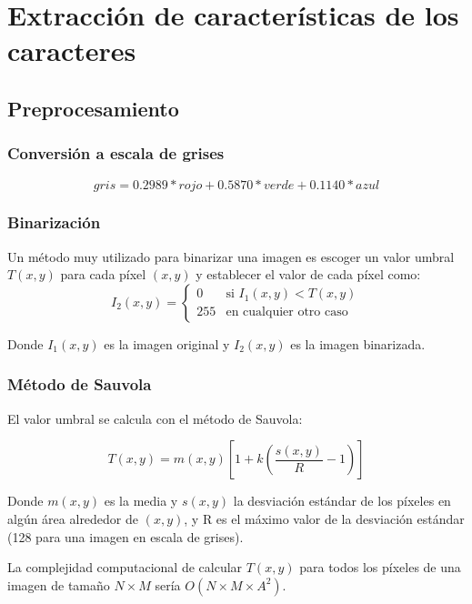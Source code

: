 \documentclass{beamer}
\begin{document}
	
	\section{Extracción de características de los caracteres}
	
	\subsection{Preprocesamiento}
	
	\begin{frame}
		\frametitle{Conversión a escala de grises}
		\begin{equation}\label{eq:bwtocv}
			gris = 0.2989 * rojo + 0.5870 * verde + 0.1140 * azul 
		\end{equation}
	\end{frame}
	
	\begin{frame}
	\frametitle{Binarización}
	Un método muy utilizado para binarizar una imagen es escoger un valor umbral $T(x,y)$ para cada píxel $(x,y)$ y establecer el valor de cada píxel como:
	\begin{equation}\label{binEq}
	I_2(x,y) = \left\{ \begin{array}{ll}
		0   & \mbox{si $I_1(x,y) < T(x,y)$} \\
		255 & \mbox{en cualquier otro caso}
	\end{array} \right. 
	\end{equation}
	
	Donde $I_1(x,y)$ es la imagen original y $I_2(x,y)$ es la imagen binarizada. 
	\end{frame}
	
	\begin{frame}
	\frametitle{Método de Sauvola}
	El valor umbral se calcula con el método de Sauvola:
	
	\begin{equation}\label{rSauvola}
	T(x,y)=m(x,y)\left[ 1 + k(\frac{s(x,y)}{R}-1) \right]
	\end{equation}
	
	Donde $m(x,y)$ es la media y $s(x,y)$ la desviación estándar de los píxeles en algún área alrededor de $(x,y)$, y R es el máximo valor de la desviación estándar (128 para una imagen en escala de grises). 
	
	La complejidad computacional de calcular $T(x,y)$ para todos los píxeles de una imagen de tamaño $N \times M$ sería $O(N \times M \times A^{2})$.
	\end{frame}
	
\end{document}
